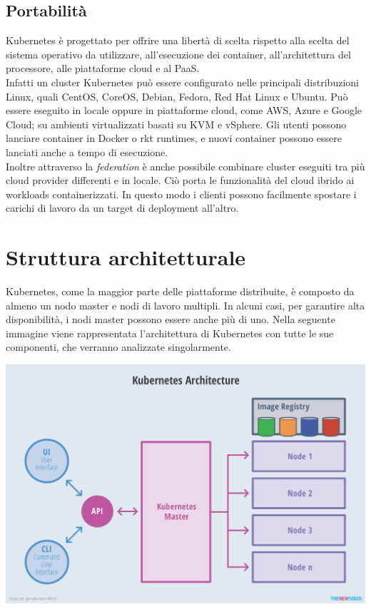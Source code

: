 \documentclass[12pt, a4paper]{report}
\begin{document}
\section{Portabilità}
Kubernetes è progettato per offrire una libertà di scelta rispetto alla scelta del sistema operativo da utilizzare, all'esecuzione dei container, all'architettura del processore, alle piattaforme cloud e al PaaS.\\
Infatti un cluster Kubernetes può essere configurato nelle principali distribuzioni Linux, quali CentOS, CoreOS, Debian, Fedora, Red Hat Linux e Ubuntu. Può essere eseguito in locale oppure in piattaforme cloud, come AWS, Azure e Google Cloud; su ambienti virtualizzati basati su KVM e vSphere. Gli utenti possono lanciare container in Docker o rkt runtimes, e nuovi container possono essere lanciati anche a tempo di esecuzione. \\
Inoltre attraverso la \textit{federation} è anche possibile combinare cluster eseguiti tra più cloud provider differenti e in locale. Ciò porta le funzionalità del cloud ibrido ai workloads containerizzati. In questo modo i clienti possono facilmente spostare i carichi di lavoro da un target di deployment all'altro.
\chapter{Struttura architetturale}
Kubernetes, come la maggior parte delle piattaforme distribuite, è composto da almeno un nodo master e nodi di lavoro multipli. In alcuni casi, per garantire alta disponibilità, i nodi master possono essere anche più di uno. Nella seguente immagine viene rappresentata l'architettura di Kubernetes con tutte le sue componenti, che verranno analizzate singolarmente.
\begin{center}
  \includegraphics[scale=0.5]{Images/Kubernetes-architecture}
\end{center}
\end{document}
